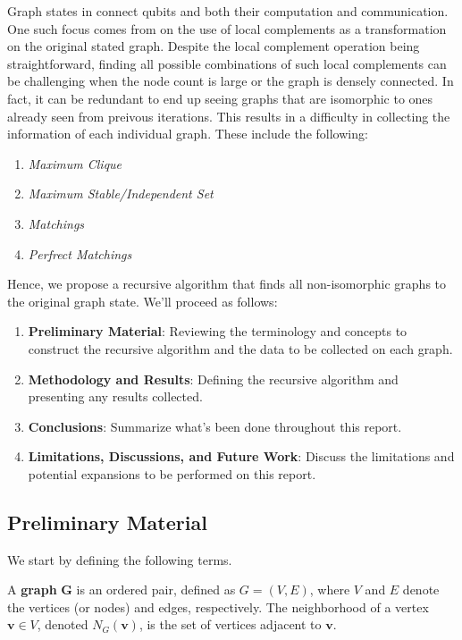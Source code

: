 \documentclass[12pt]{report} %
\begin{document}
Graph states in \cite{Vesperini_2024} connect qubits and both their computation and communication. One such focus comes from \cite{Adcock_2020} on the use of local complements as a transformation on the original stated graph. Despite the local complement operation being straightforward,
finding all possible combinations of such local complements can be challenging when the node count is large or the graph is densely connected. In fact, it can be redundant to end up seeing graphs that are isomorphic to ones already seen from preivous iterations. This results in a difficulty in collecting 
the information of each individual graph. These include the following: 
\begin{enumerate}[label=(\roman*), font=\itshape]
    \item \emph{Maximum Clique}
    \item \emph{Maximum Stable/Independent Set}
    \item \emph{Matchings}
    \item \emph{Perfrect Matchings}
\end{enumerate}

Hence, we propose a recursive algorithm that finds all non-isomorphic graphs to the original graph state. We'll proceed as follows: 
\begin{enumerate}[label=(\roman*), font=\itshape]
    \item \textbf{Preliminary Material}: Reviewing the terminology and concepts to construct the recursive algorithm and the data to be collected on each graph. 
    \item \textbf{Methodology and Results}: Defining the recursive algorithm and presenting any results collected.  
    \item \textbf{Conclusions}: Summarize what's been done throughout this report. 
    \item \textbf{Limitations, Discussions, and Future Work}: Discuss the limitations and potential expansions to be performed on this report. 
\end{enumerate}

\subsection*{Preliminary Material}

We start by defining the following terms.

\begin{tcolorbox}[colback=orange!10!white, colframe=orange!75!black, title=\textbf{Definition}]
    A \textbf{graph} $\mathbf{G}$ is an ordered pair, defined as $G = (V, E)$, where $V$ and $E$ denote the vertices (or nodes) and edges, respectively. The neighborhood
    of a vertex $\mathbf{v} \in V$, denoted $N_{G}(\mathbf{v})$, is the set of vertices adjacent to $\mathbf{v}$. 
\end{tcolorbox}
\end{document}
